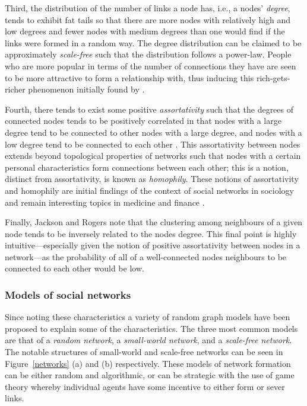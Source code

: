 Third, the distribution of the number of links a node has, i.e., a nodes' \emph{degree}, tends to exhibit fat tails so that there are more nodes with relatively high and low degrees and fewer nodes with medium degrees than one would find if the links were formed in a random way. The degree distribution can be claimed to be approximately \emph{scale-free} such that the distribution follows a power-law. People who are more popular in terms of the number of connections they have are seen to be more attractive to form a relationship with, thus inducing this rich-gets-richer phenomenon initially found by \citet{Simon1955}.

Fourth, there tends to exist some positive \emph{assortativity} such that the degrees of connected nodes tends to be positively correlated in that nodes with a large degree tend to be connected to other nodes with a large degree, and nodes with a low degree tend to be connected to each other \citep{Newman2003mixing}. This assortativity between nodes extends beyond topological properties of networks such that nodes with a certain personal characteristics form connections between each other; this is a notion, distinct from assortativity, is known as \emph{homophily}. These notions of assortativity and homophily are initial findings of the context of social networks in sociology \citep{McPherson2001} and remain interesting topics in medicine and finance \citep{Haldane2009, HaldaneMay2011}.

Finally, Jackson and Rogers note that the clustering among neighbours of a given node tends to be inversely related to the nodes degree. This final point is highly intuitive---especially given the notion of positive assortativity between nodes in a network---as the probability of all of a well-connected nodes neighbours to be connected to each other would be low.

\subsubsection{Models of social networks}

Since noting these characteristics a variety of random graph models have been proposed to explain some of the characteristics. The three most common models are that of a \emph{random network}, a \emph{small-world network}, and a \emph{scale-free network}. The notable structures of small-world and scale-free networks can be seen in Figure~\ref{networks} (a) and (b) respectively. These models of network formation can be either random and algorithmic, or can be strategic with the use of game theory whereby individual agents have some incentive to either form or sever links.

